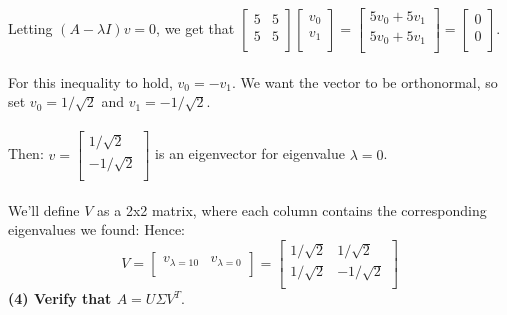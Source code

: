 \documentclass[11pt]{article}
\begin{document}
Letting $(A - \lambda I)v = 0$, we get that $ \begin{bmatrix}
5 & 5 \\
5 & 5 \\
\end{bmatrix} \begin{bmatrix}
v_0 \\
v_1 \\
\end{bmatrix} = \begin{bmatrix}
5v_0 + 5v_1 \\
5v_0 + 5v_1 \\
\end{bmatrix} = \begin{bmatrix}
0 \\
0 \\
\end{bmatrix} $. \\\\
For this inequality to hold, $v_0 = -v_1$. We want the vector to be orthonormal, so set $v_0 = 1 / \sqrt2$ and $v_1 = - 1 / \sqrt2.$ \\\\
Then: $v = \begin{bmatrix}
1 / \sqrt2 \\
- 1 / \sqrt2 \\
\end{bmatrix}$ is an eigenvector for eigenvalue $\lambda = 0$. \\\\
We'll define $V$ as a 2x2 matrix, where each column contains the corresponding eigenvalues we found:
Hence:
$$ \boxed{ V = \begin{bmatrix} 
v_{\lambda = 10} & v_{\lambda = 0} \\
\end{bmatrix} = \begin{bmatrix}
1 / \sqrt2 & 1 / \sqrt2 \\
1 / \sqrt2 & -1 / \sqrt2 \\
\end{bmatrix}}$$
\textbf{(4) Verify that $A = U \Sigma V^T.$}
\end{document}

